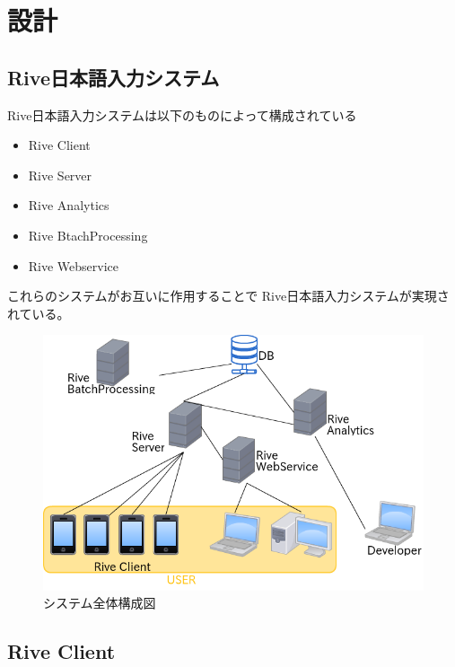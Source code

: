 \chapter{設計}
\label{chap:design}

\section{Rive日本語入力システム}

Rive日本語入力システムは以下のものによって構成されている

\begin{itemize}
  \item Rive Client
  \item Rive Server
  \item Rive Analytics
  \item Rive BtachProcessing
  \item Rive Webservice
\end{itemize}

これらのシステムがお互いに作用することで
Rive日本語入力システムが実現されている。

\begin{figure}[htbp]
  \begin{center}
    \includegraphics[width=12cm,bb=0 0 540 448]{images/systemstructure.png}
  \end{center}
  \caption{システム全体構成図}
  \label{fig:systemstructure}
\end{figure}



\section{Rive Client}

